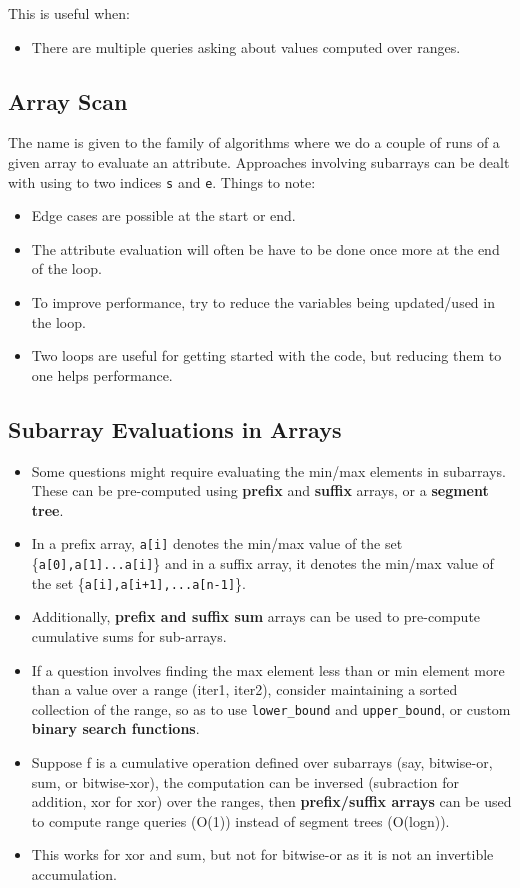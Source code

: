 \documentclass{article}
\begin{document}
This is useful when:
\begin{itemize}
\item There are multiple queries asking about values computed over ranges.
\end{itemize}
\subsection{Array Scan}
The name is given to the family of algorithms where we do a couple of runs of a given array to evaluate an attribute. Approaches involving subarrays can be dealt with using to two indices \texttt{s} and \texttt{e}. Things to note:
\begin{itemize}
    \item Edge cases are possible at the start or end.
    \item The attribute evaluation will often be have to be done once more at the end of the loop.
    \item To improve performance, try to reduce the variables being updated/used in the loop.
    \item Two loops are useful for getting started with the code, but reducing them to one helps performance.
\end{itemize}
\subsection{Subarray Evaluations in Arrays}
\begin{itemize}
\item Some questions might require evaluating the min/max elements in subarrays. These can be pre-computed using
\textbf{prefix} and \textbf{suffix} arrays, or a \textbf{segment tree}.
\item  In a prefix array, \texttt{a[i]} denotes the min/max value
of the set \{\texttt{a[0],a[1]...a[i]}\} and in a suffix array, it denotes the min/max value
of the set \{\texttt{a[i],a[i+1],...a[n-1]}\}.
\item Additionally, \textbf{prefix and suffix sum} arrays
can be used to pre-compute cumulative sums for sub-arrays.
\item If a question involves finding
the max element less than or min element more than a value over a range (iter1, iter2), consider maintaining 
a sorted collection of the range, so as to use \texttt{lower\_bound} and \texttt{upper\_bound}, or custom \textbf{binary search functions}.
\item Suppose f is a cumulative operation defined over subarrays (say, bitwise-or, sum, or bitwise-xor), the computation can be inversed (subraction for addition, xor for xor) over the ranges, then \textbf{prefix/suffix arrays} can be used to compute
range queries (O(1)) instead of segment trees (O(logn)).
\item This works for xor and sum, but not for bitwise-or as it is not an invertible accumulation. 
\end{itemize}
\end{document}
